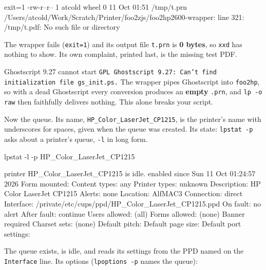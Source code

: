 \documentclass[11pt,a4paper]{article}
\begin{document}
\begin{cmdout}
exit=1
-rw-r--r--  1 atcold  wheel  0 11 Oct 01:51 /tmp/t.prn
/Users/atcold/Work/Scratch/Printer/foo2zjs/foo2hp2600-wrapper: line 321: /tmp/t.pdf: No such file or directory
\end{cmdout}

The wrapper fails (\texttt{exit=1}) and its output file \texttt{t.prn} is \textbf{0 bytes}, so \texttt{xxd} has nothing to show. Its own complaint, printed last, is the missing test PDF.

\begin{culprit}{Ghostscript 9.27 cannot start}
\texttt{GPL Ghostscript 9.27: Can't find initialization file gs\_init.ps.} The wrapper pipes Ghostscript into \texttt{foo2hp}, so with a dead Ghostscript every conversion produces an \textbf{empty} \texttt{.prn}, and \texttt{lp -o raw} then faithfully delivers nothing. This alone breaks your script.
\end{culprit}

Now the queue. Its name, \texttt{HP\_Color\_LaserJet\_CP1215}, is the printer's name with underscores for spaces, given when the queue was created. Its state: \texttt{lpstat -p} asks about a printer's queue, \texttt{-l} in long form.

\begin{mine}
lpstat -l -p HP_Color_LaserJet_CP1215
\end{mine}
\begin{cmdout}
printer HP_Color_LaserJet_CP1215 is idle.  enabled since Sun 11 Oct 01:24:57 2026
	Form mounted:
	Content types: any
	Printer types: unknown
	Description: HP Color LaserJet CP1215
	Alerts: none
	Location: AlfMAC3
	Connection: direct
	Interface: /private/etc/cups/ppd/HP_Color_LaserJet_CP1215.ppd
	On fault: no alert
	After fault: continue
	Users allowed:
		(all)
	Forms allowed:
		(none)
	Banner required
	Charset sets:
		(none)
	Default pitch:
	Default page size:
	Default port settings:
\end{cmdout}

The queue exists, is idle, and reads its settings from the PPD named on the \texttt{Interface} line. Its options (\texttt{lpoptions -p} names the queue):
\end{document}
